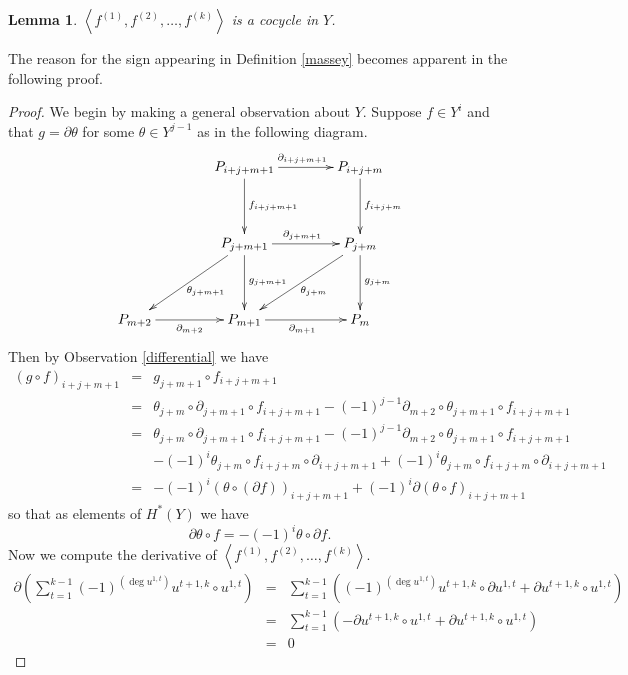 \documentclass[12pt]{article}
\newtheorem{lemma}[definition]{Lemma}
\begin{document}
\begin{lemma}\label{cocycle}
$\left\langle f^{\left(1\right)},
f^{\left(2\right)},\dots,f^{\left(k\right)}\right\rangle$
is a cocycle in $Y$.
\end{lemma}
The reason for the sign appearing 
in Definition \ref{massey} becomes apparent
in the following proof.
\begin{proof}
We begin by making a general observation about $Y$.
Suppose $f\in Y^i$ and that $g=\partial\theta$
for some $\theta\in Y^{j-1}$ as in the following diagram.
\[\xymatrix@+15pt{
&P_{i+j+m+1}\ar[r]^{\partial_{i+j+m+1}}\ar[d]^{f_{i+j+m+1}}
&P_{i+j+m}\ar[d]^{f_{i+j+m}}
\\
&P_{j+m+1}\ar[r]^{\partial_{j+m+1}}
\ar[d]^{g_{j+m+1}}\ar[dl]^{\theta_{j+m+1}}
&P_{j+m}\ar[d]^{g_{j+m}}\ar[dl]^{\theta_{j+m}}
\\
P_{m+2}\ar[r]_{\partial_{m+2}}
&P_{m+1}\ar[r]_{\partial_{m+1}}
&P_m
}\]
Then by Observation \ref{differential} we have
\begin{eqnarray*}
\left(g\circ f\right)_{i+j+m+1}
&=&g_{j+m+1}\circ f_{i+j+m+1}\\
&=&\theta_{j+m}\circ\partial_{j+m+1}\circ f_{i+j+m+1}
-\left(-1\right)^{j-1}
\partial_{m+2}\circ\theta_{j+m+1}\circ f_{i+j+m+1}\\
&=&\theta_{j+m}\circ\partial_{j+m+1}\circ f_{i+j+m+1}
-\left(-1\right)^{j-1}
\partial_{m+2}\circ\theta_{j+m+1}\circ f_{i+j+m+1}\\
&&
-\left(-1\right)^i\theta_{j+m}\circ f_{i+j+m}\circ\partial_{i+j+m+1}
+\left(-1\right)^i\theta_{j+m}\circ f_{i+j+m}\circ\partial_{i+j+m+1}\\
&=&-\left(-1\right)^i
\left(\theta\circ\left(\partial f\right)\right)_{i+j+m+1} 
+\left(-1\right)^i \partial\left(\theta\circ f\right)_{i+j+m+1}
\end{eqnarray*}
so that as elements of $H^\ast\left(Y\right)$ we have
\begin{equation}
\partial\theta\circ f
=-\left(-1\right)^i\theta\circ\partial f.\end{equation}
Now we compute the derivative of
$\left\langle f^{\left(1\right)},
f^{\left(2\right)},\dots,f^{\left(k\right)}\right\rangle$.
\begin{eqnarray*}
\partial\left(\sum_{t=1}^{k-1}
\left(-1\right)^{\left(\deg u^{1,t}\right)}
u^{t+1,k}\circ u^{1,t}\right)
&=&\sum_{t=1}^{k-1}\left(
\left(-1\right)^{\left(\deg u^{1,t}\right)}
u^{t+1,k}\circ
\partial u^{1,t}
+\partial u^{t+1,k}\circ
u^{1,t}
\right)\\
&=&\sum_{t=1}^{k-1}\left(
-\partial u^{t+1,k}\circ
u^{1,t}
+\partial u^{t+1,k}\circ
u^{1,t}
\right)\\
&=&0
\end{eqnarray*}
\end{proof}
\end{document}
